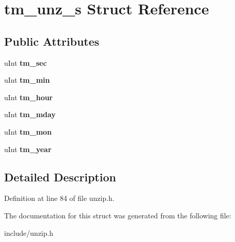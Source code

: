 \hypertarget{structtm__unz__s}{\section{tm\-\_\-unz\-\_\-s Struct Reference}
\label{structtm__unz__s}
}
\subsection*{Public Attributes}
\begin{DoxyCompactItemize}
\item 
\hypertarget{structtm__unz__s_ab91e69a9869e5db5be51b1aebaa5ea0d}{u\-Int {\bfseries tm\-\_\-sec}}\label{structtm__unz__s_ab91e69a9869e5db5be51b1aebaa5ea0d}

\item 
\hypertarget{structtm__unz__s_ac5a6bf08a4c5db8ae2243d4f0c35b192}{u\-Int {\bfseries tm\-\_\-min}}\label{structtm__unz__s_ac5a6bf08a4c5db8ae2243d4f0c35b192}

\item 
\hypertarget{structtm__unz__s_ada09255f794d6c2db07ef73b77266b9c}{u\-Int {\bfseries tm\-\_\-hour}}\label{structtm__unz__s_ada09255f794d6c2db07ef73b77266b9c}

\item 
\hypertarget{structtm__unz__s_a51ed1873e1dcabf08ff0f85caf8aefee}{u\-Int {\bfseries tm\-\_\-mday}}\label{structtm__unz__s_a51ed1873e1dcabf08ff0f85caf8aefee}

\item 
\hypertarget{structtm__unz__s_a4f5e461d8cad18d1aff7ec012168111d}{u\-Int {\bfseries tm\-\_\-mon}}\label{structtm__unz__s_a4f5e461d8cad18d1aff7ec012168111d}

\item 
\hypertarget{structtm__unz__s_a5f17147e3cfbbfdbeb2e29cbc1df8136}{u\-Int {\bfseries tm\-\_\-year}}\label{structtm__unz__s_a5f17147e3cfbbfdbeb2e29cbc1df8136}

\end{DoxyCompactItemize}


\subsection{Detailed Description}


Definition at line 84 of file unzip.\-h.



The documentation for this struct was generated from the following file\-:\begin{DoxyCompactItemize}
\item 
include/unzip.\-h\end{DoxyCompactItemize}
